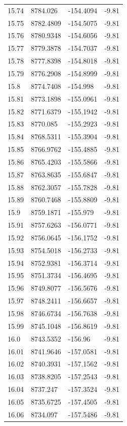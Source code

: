 \begin{table}[H]
\begin{tabular}{llll}
15.74 & 8784.026 & -154.4094 & -9.81 \\
15.75 & 8782.4809 & -154.5075 & -9.81 \\
15.76 & 8780.9348 & -154.6056 & -9.81 \\
15.77 & 8779.3878 & -154.7037 & -9.81 \\
15.78 & 8777.8398 & -154.8018 & -9.81 \\
15.79 & 8776.2908 & -154.8999 & -9.81 \\
15.8 & 8774.7408 & -154.998 & -9.81 \\
15.81 & 8773.1898 & -155.0961 & -9.81 \\
15.82 & 8771.6379 & -155.1942 & -9.81 \\
15.83 & 8770.085 & -155.2923 & -9.81 \\
15.84 & 8768.5311 & -155.3904 & -9.81 \\
15.85 & 8766.9762 & -155.4885 & -9.81 \\
15.86 & 8765.4203 & -155.5866 & -9.81 \\
15.87 & 8763.8635 & -155.6847 & -9.81 \\
15.88 & 8762.3057 & -155.7828 & -9.81 \\
15.89 & 8760.7468 & -155.8809 & -9.81 \\
15.9 & 8759.1871 & -155.979 & -9.81 \\
15.91 & 8757.6263 & -156.0771 & -9.81 \\
15.92 & 8756.0645 & -156.1752 & -9.81 \\
15.93 & 8754.5018 & -156.2733 & -9.81 \\
15.94 & 8752.9381 & -156.3714 & -9.81 \\
15.95 & 8751.3734 & -156.4695 & -9.81 \\
15.96 & 8749.8077 & -156.5676 & -9.81 \\
15.97 & 8748.2411 & -156.6657 & -9.81 \\
15.98 & 8746.6734 & -156.7638 & -9.81 \\
15.99 & 8745.1048 & -156.8619 & -9.81 \\
16.0 & 8743.5352 & -156.96 & -9.81 \\
16.01 & 8741.9646 & -157.0581 & -9.81 \\
16.02 & 8740.3931 & -157.1562 & -9.81 \\
16.03 & 8738.8205 & -157.2543 & -9.81 \\
16.04 & 8737.247 & -157.3524 & -9.81 \\
16.05 & 8735.6725 & -157.4505 & -9.81 \\
16.06 & 8734.097 & -157.5486 & -9.81 \\

\end{tabular}
\end{table}
